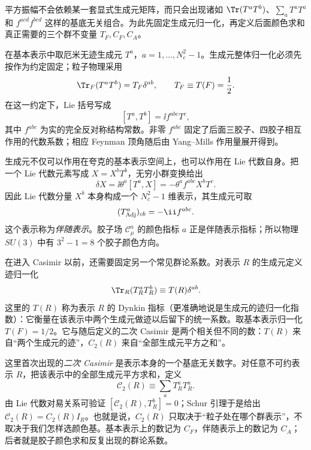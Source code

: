 平方振幅不会依赖某一套显式生成元矩阵，而只会出现诸如 $\Tr(T^aT^b)$、$\sum_aT^aT^a$ 和 $f^{acd}f^{bcd}$ 这样的基底无关组合。为此先固定生成元归一化，再定义后面颜色求和真正需要的三个群不变量 $T_F,C_F,C_A$。

在基本表示中取厄米无迹生成元 $T^a$，$a=1,\ldots,N_c^2-1$。生成元整体归一化必须先按作为约定固定；粒子物理采用
\begin{equation}
 {
 \Tr_F(T^aT^b)=T_F\delta^{ab},
 \qquad T_F\equiv T(F)=\frac12.}
 \label{eq:SUN-generator-normalization-dp10}
\end{equation}
在这一约定下，Lie 括号写成
\begin{equation}
 {
 [T^a,T^b]=\ii f^{abc}T^c,}
 \label{eq:SUN-commutator-dp10}
\end{equation}
其中 $f^{abc}$ 为实的完全反对称结构常数。非零 $f^{abc}$ 固定了后面三胶子、四胶子相互作用的代数系数；相应 Feynman 顶角随后由 Yang--Mills 作用量展开得到。

生成元不仅可以作用在夸克的基本表示空间上，也可以作用在 Lie 代数自身。把一个 Lie 代数元素写成 $X=X^bT^b$，无穷小群变换给出
\begin{equation*}
 \delta X=\ii\theta^a[T^a,X]
 =-\theta^af^{abc}X^bT^c.
\end{equation*}
因此 Lie 代数分量 $X^b$ 本身构成一个 $N_c^2-1$ 维表示，其生成元可取
\begin{equation*}
 (T_{\rm Adj}^a)_{cb}=-\ii f^{abc}.
\end{equation*}
这个表示称为\emph{伴随表示}。胶子场 $\mathscr C_\mu^a$ 的颜色指标 $a$ 正是伴随表示指标；所以物理 $SU(3)$ 中有 $3^2-1=8$ 个胶子颜色方向。

在进入 Casimir 以前，还需要固定另一个常见群论系数。对表示 $R$ 的生成元定义迹归一化
\begin{equation*}
 \Tr_R(T_R^aT_R^b)\equiv T(R)\delta^{ab}.
\end{equation*}
这里的 $T(R)$ 称为表示 $R$ 的 Dynkin 指标（更准确地说是生成元的迹归一化指数）：它衡量在该表示中两个生成元做迹以后留下的统一系数。取基本表示归一化 $T(F)=1/2$。它与随后定义的二次 Casimir 是两个相关但不同的数：$T(R)$ 来自“两个生成元的迹”，$C_2(R)$ 来自“全部生成元平方之和”。

这里首次出现的\emph{二次 Casimir} 是表示本身的一个基底无关数字。对任意不可约表示 $R$，把该表示中的全部生成元平方求和，定义
\begin{equation*}
 \mathcal C_2(R)\equiv\sum_a T_R^aT_R^a.
\end{equation*}
由 Lie 代数对易关系可验证 $[\mathcal C_2(R),T_R^b]=0$；Schur 引理于是给出 $\mathcal C_2(R)=C_2(R)I_R$。也就是说，$C_2(R)$ 只取决于“粒子处在哪个群表示”，不取决于我们怎样选颜色基。基本表示上的数记为 $C_F$，伴随表示上的数记为 $C_A$；后者就是胶子颜色求和反复出现的群论系数。

